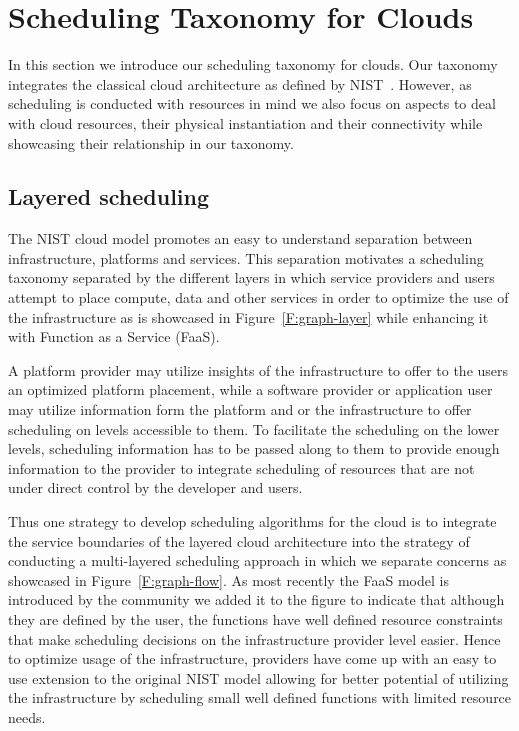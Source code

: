 \documentclass[final,5p,times,twocolumn]{elsarticle}
\begin{document}
\section{Scheduling Taxonomy for Clouds}\label{sec:taxonomy}


In this section we introduce our scheduling taxonomy for clouds. Our
taxonomy integrates the classical cloud architecture as defined by
NIST~\cite{mell2011nist}. However, as scheduling is conducted with
resources in mind we also focus on aspects to deal with cloud
resources, their physical instantiation and their connectivity while
showcasing their relationship in our taxonomy.

\subsection{Layered scheduling}

The NIST cloud model promotes an easy to understand separation between
infrastructure, platforms and services. This separation motivates a
scheduling taxonomy separated by the different layers in which service
providers and users attempt to place compute, data and other services
in order to optimize the use of the infrastructure as is showcased in
Figure~\ref{F:graph-layer} while enhancing it with Function as a Service
(FaaS).






A platform provider may utilize insights of the infrastructure to
offer to the users an optimized platform placement, while a software
provider or application user may utilize information form the platform
and or the infrastructure to offer scheduling on levels accessible to
them. To facilitate the scheduling on the lower levels, scheduling
information has to be passed along to them to provide enough
information to the provider to integrate scheduling of resources that
are not under direct control by the developer and users.

Thus one strategy to develop scheduling algorithms for the cloud is to
integrate the service boundaries of the layered cloud architecture
into the strategy of conducting a multi-layered scheduling approach in
which we separate concerns as showcased in Figure~\ref{F:graph-flow}.
As most recently the FaaS model is introduced by the community we
added it to the figure to indicate that although they are defined by
the user, the functions have well defined resource constraints that
make scheduling decisions on the infrastructure provider level easier.
Hence to optimize usage of the infrastructure, providers have come up
with an easy to use extension to the original NIST model allowing for
better potential of utilizing the infrastructure by scheduling small
well defined functions with limited resource needs.
\end{document}
